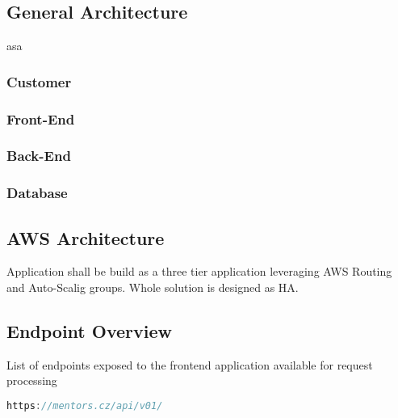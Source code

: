 \documentclass{article}
\begin{document}
\subsection{General Architecture}
asa
\subsubsection{Customer}
\subsubsection{Front-End}
\subsubsection{Back-End}
\subsubsection{Database}


\subsection{AWS Architecture}
Application shall be build as a three tier application leveraging AWS Routing and Auto-Scalig groups. Whole solution is designed as HA.

\subsection{Endpoint Overview}
List of endpoints exposed to the frontend application available for request processing

\begin{lstlisting}[language=Java, caption=Backend Application base path]
        https://mentors.cz/api/v01/
\end{lstlisting}
\end{document}
